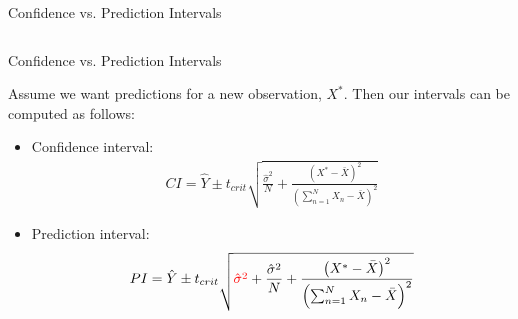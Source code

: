 \documentclass{beamer}\usepackage[]{graphicx}\usepackage[]{color}
\makeatletter
\def\maxwidth{ %
  \ifdim\Gin@nat@width>\linewidth
    \linewidth
  \else
    \Gin@nat@width
  \fi
}
\newenvironment{knitrout}{}{} %
\makeatother
\begin{document}
\begin{frame}{Confidence vs. Prediction Intervals}
\begin{columns}
\end{columns}

\end{frame}

\watermarkon %
 
\begin{frame}{Confidence vs. Prediction Intervals}
  
  Assume we want predictions for a new observation, $X^*$. Then our intervals 
  can be computed as follows:
  \vb
  \begin{itemize}
  \item Confidence interval:
    \begin{align*}
      CI = \hat{Y} \pm t_{crit} \sqrt{\frac{\hat{\sigma}^2}{N} + \frac{\left(X^* - \bar{X}\right)^2}{\left(\sum_{n = 1}^N X_n- \bar{X}\right)^2}}
    \end{align*}
  \item Prediction interval:
    \begin{align*}
      PI = \hat{Y} \pm t_{crit} \sqrt{{\color{red}\hat{\sigma}^2} + \frac{\hat{\sigma}^2}{N} + \frac{\left(X^* - \bar{X}\right)^2}{\left(\sum_{n = 1}^N X_n- \bar{X}\right)^2}}
    \end{align*}
  \end{itemize}
  
\end{frame}
\end{document}
